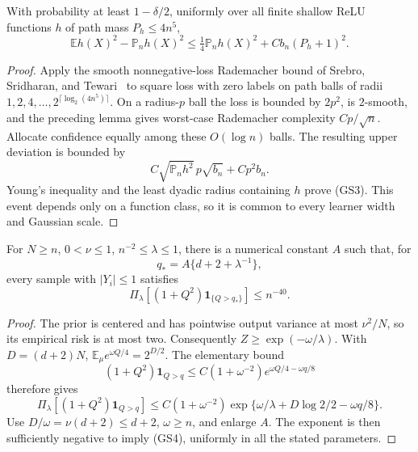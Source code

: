 \begin{lemma}
With probability at least $1-\delta/2$, uniformly over all finite
shallow ReLU functions $h$ of path mass $P_h\le 4n^5$,
\[
 \mathbb E h(X)^2-\mathbb P_n h(X)^2
 \le\tfrac14\mathbb P_n h(X)^2+C b_n(P_h+1)^2.              \tag{GS3}
\]
\end{lemma}
\begin{proof}
Apply the smooth nonnegative-loss Rademacher bound of Srebro,
Sridharan, and Tewari~\cite[Theorem~1]{sst} to square loss with zero labels on path balls
of radii $1,2,4,\ldots,2^{\lceil\log_2(4n^5)\rceil}$.
On a radius-$p$ ball the loss is bounded by $2p^2$, is $2$-smooth,
and the preceding lemma gives worst-case Rademacher complexity
$Cp/\sqrt n$. Allocate confidence equally among these
$O(\log n)$ balls. The resulting upper deviation is bounded by
\[
 C\sqrt{\mathbb P_nh^2}\,p\sqrt{b_n}+C p^2b_n.
\]
Young's inequality and the least dyadic radius containing $h$ prove
(GS3). This event depends only on a function class, so it is common
to every learner width and Gaussian scale.
\end{proof}

\begin{lemma}
For $N\ge n$, $0<\nu\le1$, $n^{-2}\le\lambda\le1$, there is a
numerical constant $A$ such that, for
\[
 q_*=A\{d+2+\lambda^{-1}\},
\]
every sample with $|Y_i|\le1$ satisfies
\[
 \Pi_\lambda[(1+Q^2)\mathbf1_{\{Q>q_*\}}]\le n^{-40}.     \tag{GS4}
\]
\end{lemma}
\begin{proof}
The prior is centered and has pointwise output variance at most
$\nu^2/N$, so its empirical risk is at most two. Consequently
$Z\ge\exp(-\omega/\lambda)$. With $D=(d+2)N$,
$\mathbb E_\mu e^{\omega Q/4}=2^{D/2}$.
The elementary bound
\[
 (1+Q^2)\mathbf1_{Q>q}
 \le C(1+\omega^{-2})e^{\omega Q/4-\omega q/8}
\]
therefore gives
\[
 \Pi_\lambda[(1+Q^2)\mathbf1_{Q>q}]
 \le C(1+\omega^{-2})
       \exp\{\omega/\lambda+D\log2/2-\omega q/8\}.
\]
Use $D/\omega=\nu(d+2)\le d+2$, $\omega\ge n$, and enlarge $A$.
The exponent is then sufficiently negative to imply (GS4),
uniformly in all the stated parameters.
\end{proof}

